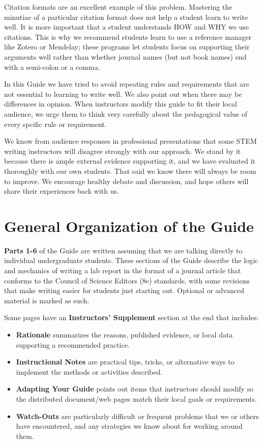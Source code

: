 \documentclass[
]{book}
\providecommand{\tightlist}{%
  \setlength{\itemsep}{0pt}\setlength{\parskip}{0pt}}
\begin{document}
Citation formats are an excellent example of this problem. Mastering the minutiae of a particular citation format does not help a student learn to write well. It is more important that a student understands HOW and WHY we use citations. This is why we recommend students learn to use a reference manager like Zotero or Mendelay; these programs let students focus on supporting their arguments well rather than whether journal names (but not book names) end with a semi-colon or a comma.

In this Guide we have tried to avoid repeating rules and requirements that are not essential to learning to write well. We also point out when there may be differences in opinion. When instructors modify this guide to fit their local audience, we urge them to think very carefully about the pedagogical value of every spcific rule or requirement.

We know from audience responses in professional presentations that some STEM writing instructors will disagree strongly with our approach. We stand by it because there is ample external evidence supporting it, and we have evaluated it thoroughly with our own students. That said we know there will always be room to improve. We encourage healthy debate and discussion, and hope others will share their experiences back with us.

\hypertarget{general-organization-of-the-guide}{%
\section*{General Organization of the Guide}\label{general-organization-of-the-guide}}

\textbf{Parts 1-6} of the Guide are written assuming that we are talking directly to individual undergraduate students. These sections of the Guide describe the logic and mechanics of writing a lab report in the format of a journal article that conforms to the Council of Science Editors (8e) standards, with some revisions that make writing easier for students just starting out. Optional or advanced material is marked as such.

Some pages have an \textbf{Instructors' Supplement} section at the end that includes:

\begin{itemize}
\tightlist
\item
  \textbf{Rationale} summarizes the reasons, published evidence, or local data supporting a recommended practice.
\item
  \textbf{Instructional Notes} are practical tips, tricks, or alternative ways to implement the methods or activities described.
\item
  \textbf{Adapting Your Guide} points out items that instructors should modify so the distributed document/web pages match their local goals or requirements.
\item
  \textbf{Watch-Outs} are particularly difficult or frequent problems that we or others have encountered, and any strategies we know about for working around them.
\end{itemize}
\end{document}
